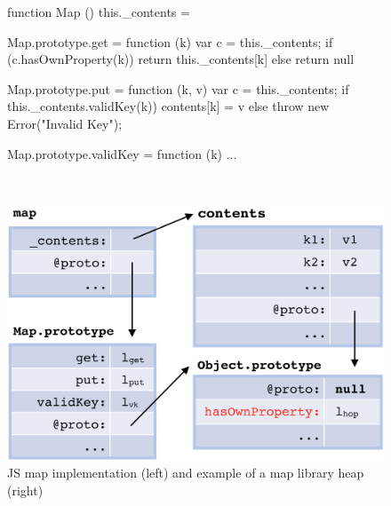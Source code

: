  \begin{figure}[t!]
 \begin{minipage}{0.56\textwidth}
 \begin{lstjs}[firstnumber=1]
function Map () { this._contents = {} }

Map.prototype.get = function (k) {
  var c = this._contents;
  if (c.hasOwnProperty(k)) {
    return this._contents[k] 
  } else { return null }
}

Map.prototype.put = function (k, v) {
  var c = this._contents;
  if this._contents.validKey(k)) {  
    contents[k] = v   
  } else
    throw new Error("Invalid Key");
} 

Map.prototype.validKey = function (k) { ... }
\end{lstjs}
\end{minipage}
\ 
 \begin{minipage}{0.43\textwidth}
 \vspace*{-0.3cm}
 \hspace*{-1.2cm}
 \includegraphics[width=1.2\textwidth]{figures/mapDiagram.png}
 \end{minipage}
\vspace*{-0.3cm}
\caption{JS map implementation (left) and example of a map library heap (right) \label{map:example}}
\vspace*{-0.5cm}
\end{figure}

